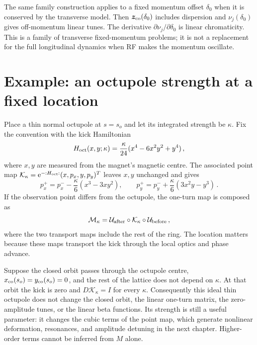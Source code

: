 The same family construction applies to a fixed momentum offset
$\delta_0$ when it is conserved by the transverse model. Then
$\vec z_{\rm co}(\delta_0)$ includes dispersion and
$\nu_j(\delta_0)$ gives off-momentum linear tunes.
The derivative $\partial\nu_j/\partial\delta_0$ is linear chromaticity.
This is a family of transverse fixed-momentum problems; it is not
a replacement for the full longitudinal dynamics when RF makes
the momentum oscillate.



\section{Example: an octupole strength at a fixed location}
\label{sec:lnf-octupole}

Place a thin normal octupole at $s = s_o$ and let its integrated strength
be $\kappa$. Fix the convention with the kick Hamiltonian
\begin{equation}\label{eq:lnf-octupole-hamiltonian}
    H_{\rm oct}(x,y;\kappa) = \frac{\kappa}{24}(x^4-6x^2y^2 + y^4)\,,
\end{equation}
where $x,y$ are measured from the magnet's magnetic centre.
The associated point map $\mathcal K_\kappa = \e^{-\lie{H_{\rm oct}}}(x,p_x,y,p_y)^T$ leaves $x,y$ unchanged
and gives
\begin{equation}\label{eq:lnf-octupole-kick}
    p_x^+= p_x^- -\frac{\kappa}{6}(x^3-3xy^2),\qquad
    p_y^+= p_y^- + \frac{\kappa}{6}(3x^2y-y^3)\,.
\end{equation}
If the observation point differs from the octupole, the one-turn
map is composed as
\begin{equation}
    \mathcal M_\kappa = \mathcal U_{\rm after}\circ\mathcal K_\kappa
    \circ\mathcal U_{\rm before}\,,
\end{equation}
where the two transport maps include the rest of the ring.
The location matters because these maps transport the kick through
the local optics and phase advance.

Suppose the closed orbit passes through the octupole centre,
$x_{\rm co}(s_o) = y_{\rm co}(s_o) = 0$, and the rest of the lattice
does not depend on $\kappa$. At that orbit the kick is zero and
$D\mathcal K_\kappa = I$ for every $\kappa$. Consequently this
ideal thin octupole does not change the closed orbit, the linear
one-turn matrix, the zero-amplitude tunes, or the linear beta
functions. Its strength is still a useful parameter: it changes
the cubic terms of the point map, which generate nonlinear
deformation, resonances, and amplitude detuning in the next chapter.
Higher-order terms cannot be inferred from $M$ alone.

